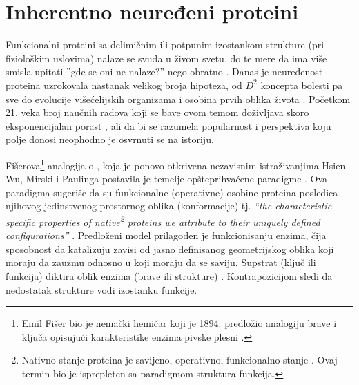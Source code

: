 
\chapter{Inherentno neuređeni proteini} %

\label{IDP} %


Funkcionalni proteini sa delimičnim ili potpunim izostankom strukture (pri
fiziološkim uslovima) nalaze se svuda u živom svetu, do te mere da ima više
smisla upitati ''gde se oni ne nalaze?'' nego obratno \parencite{uversky2016}.
Danas je neuređenost proteina uzrokovala nastanak velikog broja hipoteza, od
$D^2$ koncepta bolesti \parencite{Uversky2008} pa sve do evolucije
višećelijskih organizama \parencite{Romero2006} i osobina prvih oblika života
\parencite{uversky2016, Trifonov2000}. Početkom 21. veka broj
naučnih radova koji se bave ovom temom doživljava skoro eksponencijalan
porast \parencite{oldfield2014}, ali  da bi se razumela popularnost i 
perspektiva koju polje donosi neophodno je osvrnuti se na istoriju.

Fišerova\footnote{Emil Fišer bio je nemački hemičar koji je 1894. predložio
analogiju brave i ključa opisujući karakteristike enzima pivske
plesni \parencite{dunker2001}.} analogija o , koja je ponovo
otkrivena nezavisnim istraživanjima Hsien Wu,  Mirski i Paulinga 
postavila je temelje opšteprihvaćene
paradigme  \parencite{dunker2001}.
Ova paradigma sugeriše da su funkcionalne (operativne) osobine proteina
posledica njihovog jedinstvenog prostornog oblika (konformacije) tj.
\textit{“the characteristic specific properties of native\footnote{Nativno stanje
  proteina je savijeno, operativno, funkcionalno stanje \parencite{dunker2001}.
Ovaj termin bio je isprepleten sa paradigmom struktura-funkcija.} proteins we
attribute to their uniquely defined configurations”} \parencite{MirskyPauling1936}. Predloženi model prilagođen je
funkcionisanju enzima, čija sposobnost da katalizuju zavisi od jasno
definisanog geometrijskog oblika koji moraju da zauzmu odnosno u koji moraju da
se saviju.  Supstrat (ključ ili funkcija) diktira oblik enzima (brave ili
strukture) \parencite{biology}.  Kontrapozicijom sledi da nedostatak strukture
vodi izostanku funkcije.

